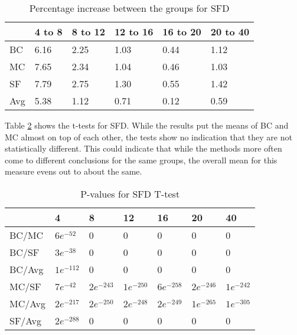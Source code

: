 \begin{table}[H]
	\centering
	\begin{tabular}{|l|lllll|}\hline
		& 4 to 8 & 8 to 12 & 12 to 16 & 16 to 20 & 20 to 40 \\ \hline
		BC 	& 6.16	& 2.25	& 1.03	& 0.44	& 1.12 \\
		MC  & 7.65	& 2.34	& 1.04	& 0.46	& 1.03 \\
		SF  & 7.79	& 2.75	& 1.30	& 0.55	& 1.42 \\
		Avg	& 5.38	& 1.12	& 0.71	& 0.12	& 0.59 \\ \hline
	\end{tabular}
	\caption{Percentage increase between the groups for SFD}
	\label{tbl:sfd}
\end{table}

Table \ref{tbl:sfd_ttest} shows the t-tests for SFD. While the results put the means of BC and MC almost on top of each other, the tests show no indication that they are not statistically different. This could indicate that while the methods more often come to different conclusions for the same groups, the overall mean for this measure evens out to about the same.

\begin{table}[H]
	\centering
	\begin{tabular}{|l|llllll|}\hline
		& 4 & 8 & 12 & 16 & 20 & 40 \\\hline
		BC/MC	& $6e^{-52}$	& 0	& 0	& 0	& 0 & 0 \\
		BC/SF	& $3e^{-38}$	& 0	& 0	& 0	& 0 & 0 \\
		BC/Avg	& $1e^{-112}$	& 0	& 0	& 0	& 0 & 0 \\
		MC/SF	& $7e^{-42}$	& $2e^{-243}$ 	& $1e^{-250}$	& $6e^{-258}$	& $2e^{-246}$ & $1e^{-242}$ \\
		MC/Avg	& $2e^{-217}$	& $2e^{-250}$ 	& $2e^{-248}$	& $2e^{-249}$	& $1e^{-265}$ & $1e^{-305}$ \\
		SF/Avg	& $2e^{-288}$	& 0	& 0	& 0	& 0 & 0 \\ \hline
	\end{tabular}
	\caption{P-values for SFD T-test}
	\label{tbl:sfd_ttest}
\end{table}